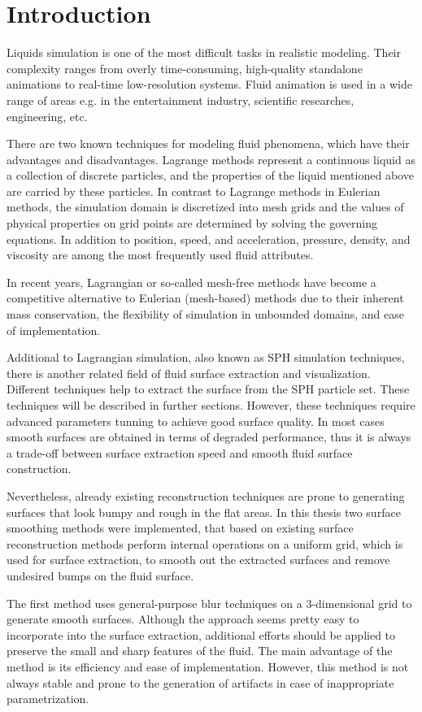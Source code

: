 \chapter{Introduction}
Liquids simulation is one of the most difficult tasks in realistic modeling. Their complexity ranges from overly time-consuming, high-quality standalone animations to real-time low-resolution systems. Fluid animation is used in a wide range of areas e.g. in the entertainment industry, scientific researches, engineering, etc. 

There are two known techniques for modeling fluid phenomena, which have their advantages and disadvantages. Lagrange methods represent a continuous liquid as a collection of discrete particles, and the properties of the liquid mentioned above are carried by these particles. In contrast to Lagrange methods in Eulerian methods, the simulation domain is discretized into mesh grids and the values of physical properties on grid points are determined by solving the governing equations. In addition to position, speed, and acceleration, pressure, density, and viscosity are among the most frequently used fluid attributes.

In recent years, Lagrangian or so-called mesh-free methods have become a competitive alternative to Eulerian (mesh-based) methods due to their inherent mass conservation, the flexibility of simulation in unbounded domains, and ease of implementation.

Additional to Lagrangian simulation, also known as SPH simulation techniques, there is another related field of fluid surface extraction and visualization. Different techniques help to extract the surface from the SPH particle set. These techniques will be described in further sections. However, these techniques require advanced parameters tunning to achieve good surface quality. In most cases smooth surfaces are obtained in terms of degraded performance, thus it is always a trade-off between surface extraction speed and smooth fluid surface construction.

Nevertheless, already existing reconstruction techniques are prone to generating surfaces that look bumpy and rough in the flat areas. In this thesis two surface smoothing methods were implemented, that based on existing surface reconstruction methods perform internal operations on a uniform grid, which is used for surface extraction, to smooth out the extracted surfaces and remove undesired bumps on the fluid surface.

The first method uses general-purpose blur techniques on a 3-dimensional grid to generate smooth surfaces. Although the approach seems pretty easy to incorporate into the surface extraction, additional efforts should be applied to preserve the small and sharp features of the fluid. The main advantage of the method is its efficiency and ease of implementation. However, this method is not always stable and prone to the generation of artifacts in case of inappropriate parametrization.

